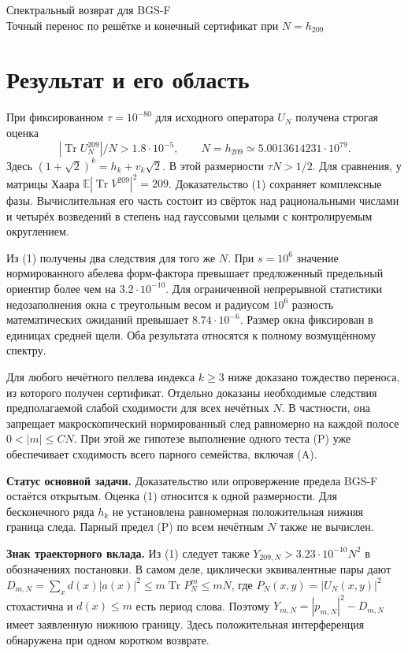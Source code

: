 \documentclass[11pt,a4paper]{article}
\newcommand{\Tr}{\operatorname{Tr}}
\newcommand{\EE}{\mathbb E}
\newcommand{\sect}[1]{\section*{\sffamily\color{ink}#1}}
\newcommand{\subt}[1]{\par\medskip\noindent\textbf{#1.}\quad}
\begin{document}
\begin{center}{\LARGE\sffamily Спектральный возврат для BGS-F}\\[4pt]
{\large Точный перенос по решётке и конечный сертификат при $N=h_{209}$}
\end{center}
\sect{Результат и его область}
При фиксированном $\tau=10^{-80}$ для исходного оператора $U_N$ получена строгая оценка
\[
 \boxed{\quad |\Tr U_N^{209}|/N>1.8\cdot10^{-5},\qquad
 N=h_{209}\simeq5.0013614231\cdot10^{79}.\quad}                 \tag{1}
\]
Здесь $(1+\sqrt2)^k=h_k+v_k\sqrt2$. В этой размерности $\tau N>1/2$. Для сравнения, у матрицы Хаара $\EE|\Tr V^{209}|^2=209$. Доказательство (1) сохраняет комплексные фазы. Вычислительная его часть состоит из свёрток над рациональными числами и четырёх возведений в степень над гауссовыми целыми с контролируемым округлением.
    
Из (1) получены два следствия для того же $N$. При $s=10^6$ значение нормированного абелева форм-фактора превышает предложенный предельный ориентир более чем на $3.2\cdot10^{-10}$. Для ограниченной непрерывной статистики недозаполнения окна с треугольным весом и радиусом $10^6$ разность математических ожиданий превышает $8.74\cdot10^{-6}$. Размер окна фиксирован в единицах средней щели. Оба результата относятся к полному возмущённому спектру.

Для любого нечётного пеллева индекса $k\ge3$ ниже доказано тождество переноса, из которого получен сертификат. Отдельно доказаны необходимые следствия предполагаемой слабой сходимости для всех нечётных $N$. В частности, она запрещает макроскопический нормированный след равномерно на каждой полосе $0<|m|\le CN$. При этой же гипотезе выполнение одного теста (P) уже обеспечивает сходимость всего парного семейства, включая (A).

\subt{Статус основной задачи} Доказательство или опровержение предела BGS-F остаётся открытым. Оценка (1) относится к одной размерности. Для бесконечного ряда $h_k$ не установлена равномерная положительная нижняя граница следа. Парный предел (P) по всем нечётным $N$ также не вычислен.

\subt{Знак траекторного вклада} Из (1) следует также $Y_{209,N}>3.23\cdot10^{-10}N^2$ в обозначениях постановки. В самом деле, циклически эквивалентные пары дают $D_{m,N}=\sum_x d(x)|a(x)|^2\le m\Tr P_N^m\le mN$, где $P_N(x,y)=|U_N(x,y)|^2$ стохастична и $d(x)\le m$ есть период слова. Поэтому $Y_{m,N}=|p_{m,N}|^2-D_{m,N}$ имеет заявленную нижнюю границу. Здесь положительная интерференция обнаружена при одном коротком возврате.
\end{document}
